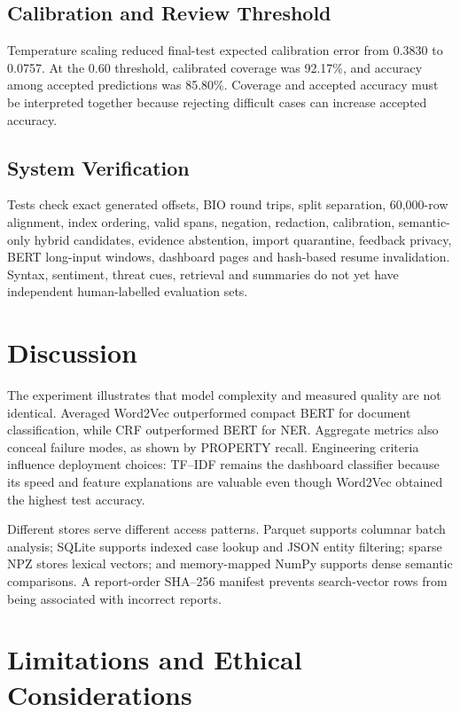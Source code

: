 \documentclass[conference]{IEEEtran}
\begin{document}
\subsection{Calibration and Review Threshold}

Temperature scaling reduced final-test expected calibration error from 0.3830 to 0.0757. At the 0.60 threshold, calibrated coverage was 92.17\%, and accuracy among accepted predictions was 85.80\%. Coverage and accepted accuracy must be interpreted together because rejecting difficult cases can increase accepted accuracy.

\subsection{System Verification}

Tests check exact generated offsets, BIO round trips, split separation, 60,000-row alignment, index ordering, valid spans, negation, redaction, calibration, semantic-only hybrid candidates, evidence abstention, import quarantine, feedback privacy, BERT long-input windows, dashboard pages and hash-based resume invalidation. Syntax, sentiment, threat cues, retrieval and summaries do not yet have independent human-labelled evaluation sets.

\section{Discussion}

The experiment illustrates that model complexity and measured quality are not identical. Averaged Word2Vec outperformed compact BERT for document classification, while CRF outperformed BERT for NER. Aggregate metrics also conceal failure modes, as shown by PROPERTY recall. Engineering criteria influence deployment choices: TF--IDF remains the dashboard classifier because its speed and feature explanations are valuable even though Word2Vec obtained the highest test accuracy.

Different stores serve different access patterns. Parquet supports columnar batch analysis; SQLite supports indexed case lookup and JSON entity filtering; sparse NPZ stores lexical vectors; and memory-mapped NumPy supports dense semantic comparisons. A report-order SHA--256 manifest prevents search-vector rows from being associated with incorrect reports.

\section{Limitations and Ethical Considerations}
\end{document}
